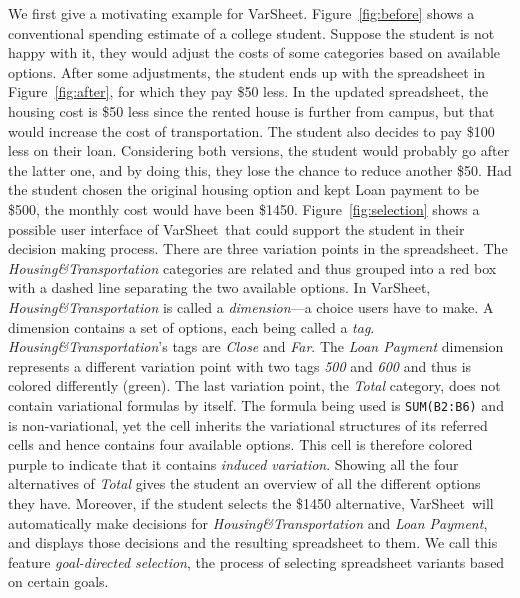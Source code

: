 \documentclass[conference]{IEEEtran}
\newcommand{\prog}[1]{{\small\texttt{#1}}}
\newcommand{\varsheet}{VarSheet}
\newcommand{\gds}{goal-directed selection}
\newcommand{\mapname}[1]{\textit{#1}}
\newcommand{\htdim}{Housing\&Transportation}
\newcommand{\lpdim}{Loan Payment}
\begin{document}
We first give a motivating example for \varsheet. 
Figure~\ref{fig:before} shows a conventional spending estimate of a 
college student. Suppose the student is not happy with it, they would 
adjust the costs of some categories based on available options. After 
some adjustments, the student ends up with the spreadsheet in 
Figure~\ref{fig:after}, for which they pay \$50 less. In the updated 
spreadsheet, the housing cost is \$50 less since the rented house is 
further from campus, but that would increase the cost of transportation. 
The student also decides to pay \$100 less on their loan. Considering 
both versions, the student would probably go after the latter one, and 
by doing this, they lose the chance to reduce another \$50. Had the 
student chosen the original housing option and kept Loan payment to be 
\$500, the monthly cost would have been \$1450. 
%
Figure~\ref{fig:selection} shows a possible user interface of 
\varsheet~that could support the student in their decision making 
process. There are three variation points in the spreadsheet. The 
\mapname{\htdim} categories are related and thus grouped into a red box 
with a dashed line separating the two available options. In \varsheet, 
\mapname{\htdim} is called a \emph{dimension}---a choice users have to 
make. A dimension contains a set of options, each being called a 
\emph{tag}. \mapname{\htdim}'s tags are \mapname{Close} and 
\mapname{Far}. The \mapname{\lpdim} dimension represents a different 
variation point with two tags \mapname{500} and \mapname{600} and thus 
is colored differently (green). The last variation point, the 
\mapname{Total} category, does not contain variational formulas by 
itself. The formula being used is \prog{SUM(B2:B6)} and is 
non-variational, yet the cell inherits the variational structures of its 
referred cells and hence contains four available options. This cell is 
therefore colored purple to indicate that it contains \emph{induced 
variation}. Showing all the four alternatives of \mapname{Total} gives 
the student an overview of all the different options they have. 
Moreover, if the student selects the \$1450 alternative, \varsheet~will 
automatically make decisions for \mapname{\htdim} and \mapname{\lpdim}, 
and displays those decisions and the resulting spreadsheet to them. We 
call this feature \emph{\gds}, the process of selecting spreadsheet 
variants based on certain goals. 
\end{document}
